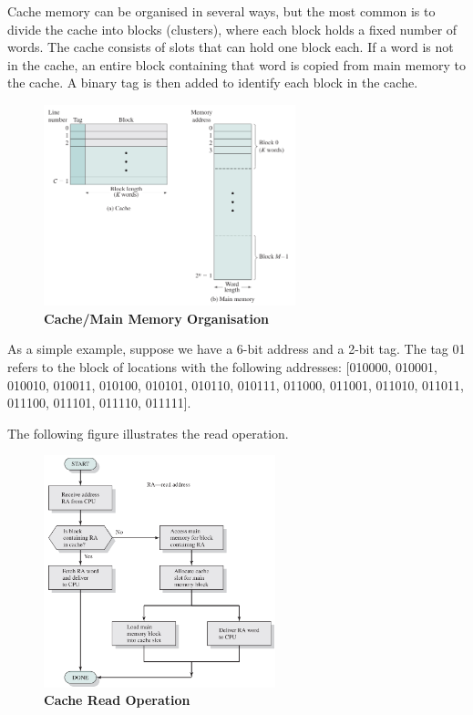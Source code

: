\documentclass{article}
\begin{document}
Cache memory can be organised in several ways, but the most common is to divide the cache into blocks (clusters), where each block holds a fixed number of words.
The cache consists of slots that can hold one block each. If a word is not in the cache, an entire block containing that word is copied from main memory to the cache.
A binary tag is then added to identify each block in the cache.

\begin{figure}[!h]
    \centering
    \includegraphics[width=0.65\textwidth]{figures/Ch01Figure8.png} %
    \caption{\textbf{Cache/Main Memory Organisation}}
    \label{fig:Ch01Fig8}
\end{figure}
As a simple example, suppose we have a 6-bit address and a 2-bit tag. The tag 01 
refers to the block of locations with the following addresses: [010000, 010001, 010010, 
010011, 010100, 010101, 010110, 010111, 011000, 011001, 011010, 011011, 011100, 
011101, 011110, 011111].
\vspace{0.5em}

The following figure illustrates the read operation.

\begin{figure}[!h]
    \centering
    \includegraphics[width=0.6\textwidth]{figures/Ch01Figure9.png} %
    \caption{\textbf{Cache Read Operation}}
    \label{fig:Ch01Fig9}
\end{figure}
\end{document}
